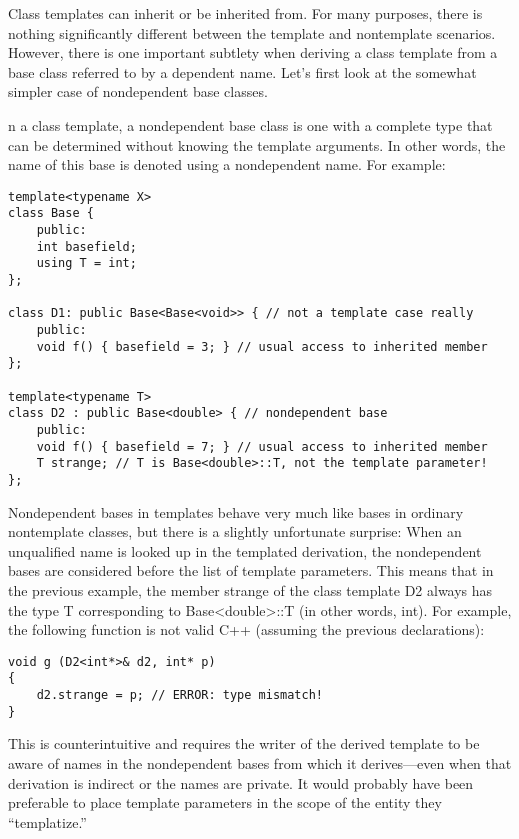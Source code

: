 
Class templates can inherit or be inherited from. For many purposes, there is nothing significantly different between the template and nontemplate scenarios. However, there is one important subtlety when deriving a class template from a base class referred to by a dependent name. Let’s first look at the somewhat simpler case of nondependent base classes.


n a class template, a nondependent base class is one with a complete type that can be determined without knowing the template arguments. In other words, the name of this base is denoted using a nondependent name. For example:

\begin{lstlisting}[style=styleCXX]
template<typename X>
class Base {
	public:
	int basefield;
	using T = int;
};

class D1: public Base<Base<void>> { // not a template case really
	public:
	void f() { basefield = 3; } // usual access to inherited member
};

template<typename T>
class D2 : public Base<double> { // nondependent base
	public:
	void f() { basefield = 7; } // usual access to inherited member
	T strange; // T is Base<double>::T, not the template parameter!
};
\end{lstlisting}

Nondependent bases in templates behave very much like bases in ordinary nontemplate classes, but there is a slightly unfortunate surprise: When an unqualified name is looked up in the templated derivation, the nondependent bases are considered before the list of template parameters. This means that in the previous example, the member strange of the class template D2 always has the type T corresponding to Base<double>::T (in other words, int). For example, the following function is not valid C++ (assuming the previous declarations):

\begin{lstlisting}[style=styleCXX]
void g (D2<int*>& d2, int* p)
{
	d2.strange = p; // ERROR: type mismatch!
}
\end{lstlisting}

This is counterintuitive and requires the writer of the derived template to be aware of names in the nondependent bases from which it derives—even when that derivation is indirect or the names are private. It would probably have been preferable to place template parameters in the scope of the entity they “templatize.”


